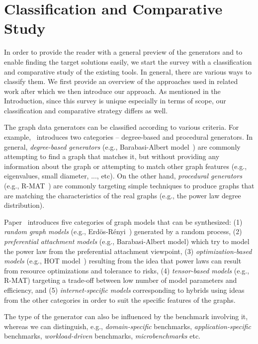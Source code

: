 \section{Classification and Comparative Study}
\label{sec:comparison}

In order to provide the reader with a general preview of the generators and  to enable finding the target solutions easily, we start the survey with a  classification and comparative study of the existing tools. In general, there are various ways to classify them. We first provide an overview of the approaches used in related work after which we then introduce our approach. As mentioned in the Introduction, since this survey is unique especially in terms of scope, our classification and comparative strategy differs as well.

The graph data generators can be classified according to various criteria. For example,~\cite{DBLP:conf/sdm/ChakrabartiZF04} introduces two categories -- degree-based and procedural generators. In general, \emph{degree-based generators} (e.g., Barabasi-Albert model~\cite{Barabasi99emergenceScaling}) are commonly attempting to find a graph that matches it, but without providing any information about the graph or attempting to match other graph features (e.g., eigenvalues, small diameter, ..., etc). On the other hand, \emph{procedural generators} (e.g., R-MAT~\cite{DBLP:conf/sdm/ChakrabartiZF04}) are commonly targeting simple techniques to produce graphs that are matching the characteristics of the real graphs (e.g., the power law degree distribution).

Paper~\cite{Chakrabarti:2006:GML:1132952.1132954} introduces five categories of graph models that can be synthesized: (1) \emph{random graph models} (e.g., Erd\"{o}s-R\'{e}nyi~\cite{Erdos:1960}) generated by a random process, (2) \emph{preferential attachment models} (e.g., Barabasi-Albert model) which try to model the power law from the preferential attachment viewpoint, (3) \emph{optimization-based models} (e.g., HOT model~\cite{PhysRevLett.84.2529}) resulting from the idea that power laws can result from resource optimizations and tolerance to risks, (4) \emph{tensor-based models} (e.g., R-MAT) targeting a trade-off between low number of model parameters and efficiency, and (5) \emph{internet-specific models} corresponding to hybrids using ideas from the other categories in order to suit the specific features of the graphs.

The type of the generator can also be influenced by the benchmark involving it, whereas we can distinguish, e.g., \emph{domain-specific} benchmarks, \emph{application-specific} benchmarks, \emph{workload-driven} benchmarks,  \emph{microbenchmarks} etc.



